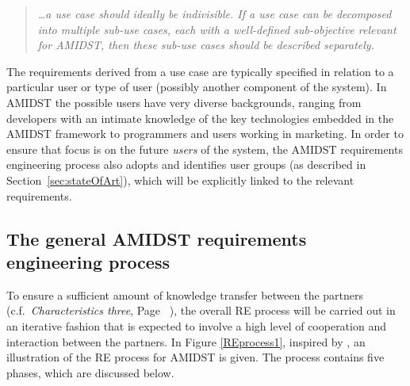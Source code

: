 \begin{quote}
\emph{  \ldots a use case should ideally be indivisible. If a use case can be decomposed into multiple
  sub-use cases, each with a well-defined sub-objective relevant for AMIDST, then these sub-use cases should be
  described separately.}
\end{quote}

The requirements derived from a use case are typically specified in relation to a particular user or type of user (possibly 
another
component of the system). In AMIDST the possible users have very diverse backgrounds, ranging from developers with an
intimate knowledge of the key technologies embedded in the AMIDST framework to programmers and users working in
marketing. In order to ensure that focus is on the future \emph{users} of the system, the AMIDST requirements
engineering process also adopts and identifies user groups (as described in Section~\ref{sec:stateOfArt}), which will be
explicitly linked to the relevant requirements.
%
%
%

\subsection{The general AMIDST requirements engineering process}
\label{sec:reprocess}

To ensure a sufficient amount of knowledge transfer between the partners (c.f.\ {\em Characteristics three}, Page~
\pageref{sec:characteristic3}),
the overall  RE process will be carried out in an iterative fashion that is expected to involve a
high level of cooperation and interaction between the partners.  
%
In Figure \ref{REprocess1}, inspired by \cite{Ebe10}, an illustration of the RE process for AMIDST is given.  The process 
contains five phases, which are discussed below.

